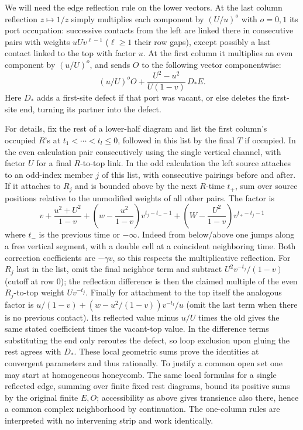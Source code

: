 \documentclass[11pt]{article}
\numberwithin{equation}{section}
\theoremstyle{definition}\newtheorem{definition}[theorem]{Definition}
\theoremstyle{remark}\newtheorem{remark}[theorem]{Remark}
\begin{document}
We will need the edge reflection rule on the lower vectors. At the last column reflection \(z\mapsto1/z\) simply multiplies each component by \((U/u)^{o}\) with \(o=0,1\) its port occupation: successive contacts from the left are linked there in consecutive pairs with weights \(uU v^{\ell-1}\) (\(\ell\ge1\) their row gaps), except possibly a last contact linked to the top with factor \(u\). At the first column it multiplies an even component by \((u/U)^o\), and sends \(O\) to the following vector componentwise:
\[
 (u/U)^o O+\frac{U^2-u^2}{U(1-v)}\,D_* E.
\]
Here \(D_*\) adds a first-site defect if that port was vacant, or else deletes the first-site end, turning its partner into the defect.

For details, fix the rest of a lower-half diagram and list the first column's occupied \(R\)'s at \(t_1<\cdots<t_l\le0\), followed in this list by the final \(T\) if occupied. In the even calculation pair consecutively using the single vertical channel, with factor \(U\) for a final \(R\)-to-top link. In the odd calculation the left source attaches to an odd-index member \(j\) of this list, with consecutive pairings before and after. If it attaches to \(R_j\) and is bounded above by the next \(R\)-time \(t_+\), sum over source positions relative to the unmodified weights of all other pairs. The factor is
\[
 v+\frac{u^2+U^2}{1-v}
 +\left(w-\frac{u^2}{1-v}\right)v^{t_j-t_- -1}
 +\left(W-\frac{U^2}{1-v}\right)v^{t_+-t_j-1}
\]
where \(t_-\) is the previous time or \(-\infty\). Indeed from below/above one jumps along a free vertical segment, with a double cell at a coincident neighboring time. Both correction coefficients are \(-\gamma v\), so this respects the multiplicative reflection. For \(R_j\) last in the list, omit the final neighbor term and subtract \(U^2 v^{-t_j}/(1-v)\) (cutoff at row 0); the reflection difference is then the claimed multiple of the even \(R_j\)-to-top weight \(U v^{-t_j}\). Finally for attachment to the top itself the analogous factor is \(u/(1-v)+(w-u^2/(1-v))v^{-t_l}/u\) (omit the last term when there is no previous contact). Its reflected value minus \(u/U\) times the old gives the same stated coefficient times the vacant-top value. In the difference terms substituting the end only reroutes the defect, so loop exclusion upon gluing the rest agrees with \(D_*\). These local geometric sums prove the identities at convergent parameters and thus rationally. To justify a common open set one may start at homogeneous honeycomb. The same local formulas for a single reflected edge, summing over finite fixed rest diagrams, bound its positive sums by the original finite \(E,O\); accessibility as above gives transience also there, hence a common complex neighborhood by continuation. The one-column rules are interpreted with no intervening strip and work identically.
\end{document}

